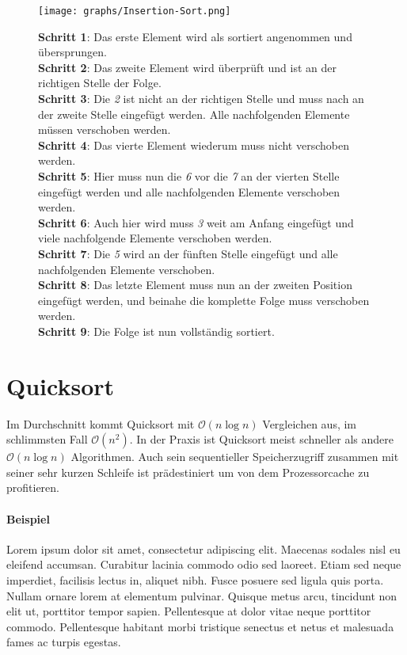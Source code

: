 \documentclass[12pt, a4paper, titlepage, hidelinks]{scrreprt}
\begin{document}
\clearpage

\begin{SCfigure}
  \centering
  \texttt{[image: graphs/Insertion-Sort.png]}
  \caption*{\textbf{Schritt 1}: Das erste Element wird als sortiert angenommen und übersprungen. \\[45pt] %
  	\textbf{Schritt 2}: Das zweite Element wird überprüft und ist an der richtigen Stelle der Folge. \\[40pt] %
  	\textbf{Schritt 3}: Die \textit{2} ist nicht an der richtigen Stelle und muss nach an der zweite Stelle eingefügt werden. Alle nachfolgenden Elemente müssen verschoben werden. \\[15pt] %
  	\textbf{Schritt 4}: Das vierte Element wiederum muss nicht verschoben werden. \\[42pt] %
  	\textbf{Schritt 5}: Hier muss nun die \textit{6} vor die \textit{7} an der vierten Stelle eingefügt werden und alle nachfolgenden Elemente verschoben werden. \\[28pt] %
  	\textbf{Schritt 6}: Auch hier wird muss \textit{3} weit am Anfang eingefügt und viele nachfolgende Elemente verschoben werden.\\[32pt] %
  	\textbf{Schritt 7}: Die \textit{5} wird an der fünften Stelle eingefügt und alle nachfolgenden Elemente verschoben. \\[26pt] %
  	\textbf{Schritt 8}: Das letzte Element muss nun an der zweiten Position eingefügt werden, und beinahe die komplette Folge muss verschoben werden. \\[16pt] %
  	\textbf{Schritt 9}: Die Folge ist nun vollständig sortiert.
  }
\end{SCfigure}
\clearpage
\section{Quicksort}

Im Durchschnitt kommt Quicksort mit $\mathcal{O}(n\log{}n)$ Vergleichen aus, im schlimmsten Fall $\mathcal{O}(n^2)$. In der Praxis ist Quicksort meist schneller als andere $\mathcal{O}(n\log{}n)$ Algorithmen. Auch sein sequentieller Speicherzugriff zusammen mit seiner sehr kurzen Schleife ist prädestiniert um von dem Prozessorcache zu profitieren.

\paragraph{Beispiel}
Lorem ipsum dolor sit amet, consectetur adipiscing elit. Maecenas sodales nisl eu eleifend accumsan. Curabitur lacinia commodo odio sed laoreet. Etiam sed neque imperdiet, facilisis lectus in, aliquet nibh. Fusce posuere sed ligula quis porta. Nullam ornare lorem at elementum pulvinar. Quisque metus arcu, tincidunt non elit ut, porttitor tempor sapien. Pellentesque at dolor vitae neque porttitor commodo. Pellentesque habitant morbi tristique senectus et netus et malesuada fames ac turpis egestas.
\end{document}
